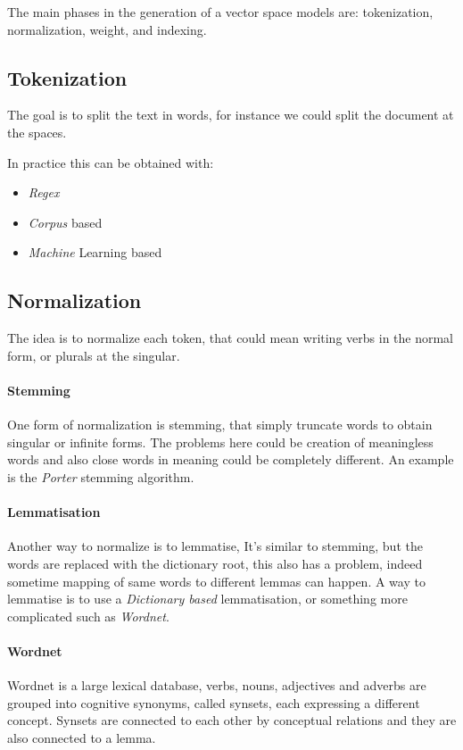 The main phases in the generation of a vector space models are:
tokenization, normalization, weight, and indexing.

\subsection{Tokenization}
The goal is to split the text in words, for instance we could split the
document at the spaces.

In practice this can be obtained with:
\begin{itemize}
    \item \emph{Regex}
    \item \emph{Corpus} based
    \item \emph{Machine} Learning based
\end{itemize}

\subsection{Normalization}
The idea is to normalize each token, that could mean writing verbs in the normal 
form, or plurals at the singular.

\paragraph{Stemming}
One form of normalization is stemming, that simply truncate words 
to obtain singular or infinite forms.
The problems here could be creation of meaningless words and also 
close words in meaning could be completely different. An example
is the \emph{Porter} stemming algorithm.

\paragraph{Lemmatisation}
Another way to normalize is to lemmatise, 
It's similar to stemming, but the words are replaced with the dictionary 
root, this also has a problem, indeed sometime mapping of same words to 
different lemmas can happen. A way to lemmatise is to use a 
\emph{Dictionary based} lemmatisation, or something more complicated 
such as \emph{Wordnet}.

\paragraph{Wordnet}
Wordnet is a large lexical database, verbs, nouns, adjectives and adverbs are
grouped into cognitive synonyms, called synsets, each expressing
a different concept.
Synsets are connected to each other by conceptual relations and they are also 
connected to a lemma.

